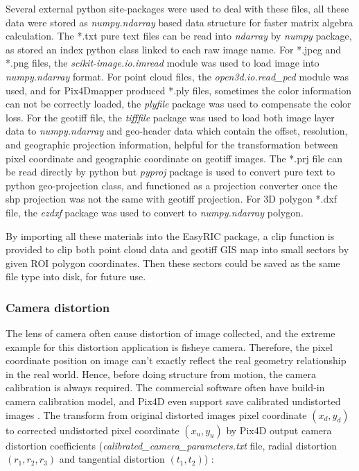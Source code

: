 \documentclass{configs/bmcart}
\begin{document}
Several external python site-packages were used to deal with these files, all these data were stored as \textit{numpy.ndarray} based data structure for faster matrix algebra calculation. The *.txt pure text files can be read into \textit{ndarray} by \textit{numpy} package, as stored an index python class linked to each raw image name. For *.jpeg and *.png files, the \textit{scikit-image.io.imread} module was used to load image into \textit{numpy.ndarray} format. For point cloud files, the \textit{open3d.io.read\_pcd} module was used, and for Pix4Dmapper produced *.ply files, sometimes the color information can not be correctly loaded, the \textit{plyfile} package was used to compensate the color loss. For the geotiff file, the \textit{tifffile} package was used to load both image layer data to \textit{numpy.ndarray} and geo-header data which contain the offset, resolution, and geographic projection information, helpful for the transformation between pixel coordinate and geographic coordinate on geotiff images. The *.prj file can be read directly by python but \textit{pyproj} package is used to convert pure text to python geo-projection class, and functioned as a projection converter once the shp projection was not the same with geotiff projection. For 3D polygon *.dxf file, the \textit{ezdxf} package was used to convert to \textit{numpy.ndarray} polygon.

By importing all these materials into the EasyRIC package, a clip function is provided to clip both point cloud data and geotiff GIS map into small sectors by given ROI polygon coordinates. Then these sectors could be saved as the same file type into disk, for future use.

\subsubsection*{Camera distortion}
The lens of camera often cause distortion of image collected, and the extreme example for this distortion application is fisheye camera. Therefore, the pixel coordinate position on image can't exactly reflect the real geometry relationship in the real world. Hence, before doing structure from motion, the camera calibration is always required. The commercial software often have build-in camera calibration model, and Pix4D even support save calibrated undistorted images \cite{pix4d_support_menu_2020}. The transform from original distorted images pixel coordinate $(x_d, y_d)$ to corrected undistorted pixel coordinate $(x_u, y_u)$ by Pix4D output camera distortion coefficients (\textit{calibrated\_camera\_parameters.txt} file, radial distortion $(r_1, r_2, r_3)$ and tangential distortion $(t_1, t_2)$) \cite{pix4d_support_how_2020}:
\end{document}
